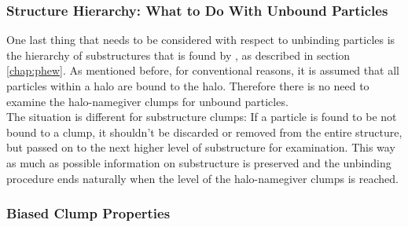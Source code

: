 \subsubsection{Structure Hierarchy: What to Do With Unbound Particles}

One last thing that needs to be considered with respect to unbinding particles is the hierarchy of substructures that is found by \phew, as described in section \ref{chap:phew}.
As mentioned before, for conventional reasons, it is assumed that all particles within a halo are bound to the halo. 
Therefore there is no need to examine the halo-namegiver clumps for unbound particles.\\
The situation is different for substructure clumps:
If a particle is found to be not bound to a clump, it shouldn't be discarded or removed from the entire structure, but passed on to the next higher level of substructure for examination. 
This way as much as possible information on substructure is preserved and the unbinding procedure ends naturally when the level of the halo-namegiver clumps is reached.

















\subsubsection{Biased Clump Properties}\label{chap:iter_theory}

